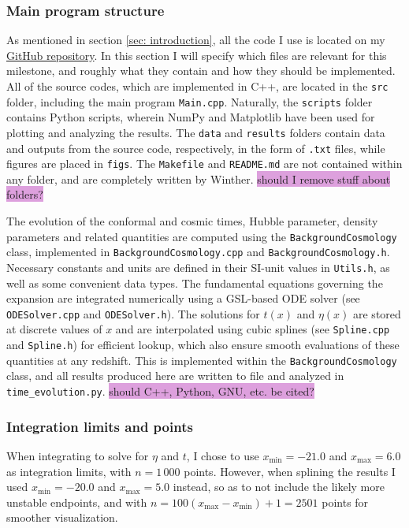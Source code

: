 \documentclass{aa}
\begin{document}
\subsubsection{Main program structure}
As mentioned in section \ref{sec: introduction}, all the code I use is located on my \href{https://github.com/paljettrosa/AST5220}{GitHub repository}. In this section I will specify which files are relevant for this milestone, and roughly what they contain and how they should be implemented. All of the source codes, which are implemented in C++, are located in the \verb|src| folder, including the main program \verb|Main.cpp|. Naturally, the \verb|scripts| folder contains Python scripts, wherein NumPy and Matplotlib have been used for plotting and analyzing the results. The \verb|data| and \verb|results| folders contain data and outputs from the source code, respectively, in the form of \verb|.txt| files, while figures are placed in \verb|figs|. The \verb|Makefile| and \verb|README.md| are not contained within any folder, and are completely written by Winther. \colorbox{Plum}{should I remove stuff about folders?}

The evolution of the conformal and cosmic times, Hubble parameter, density parameters and related quantities are computed using the \verb|BackgroundCosmology| class, implemented in \verb|BackgroundCosmology.cpp| and \verb|BackgroundCosmology.h|. Necessary constants and units are defined in their SI-unit values in \verb|Utils.h|, as well as some convenient data types. The fundamental equations governing the expansion are integrated numerically using a GSL-based ODE solver (see \verb|ODESolver.cpp| and \verb|ODESolver.h|). The solutions for $t(x)$ and $\eta(x)$ are stored at discrete values of $x$ and are interpolated using cubic splines (see \verb|Spline.cpp| and \verb|Spline.h|) for efficient lookup, which also ensure smooth evaluations of these quantities at any redshift. This is implemented within the \verb|BackgroundCosmology| class, and all results produced here are written to file and analyzed in \verb|time_evolution.py|. \colorbox{Plum}{should C++, Python, GNU, etc. be cited?}


\subsubsection{Integration limits and points}
When integrating to solve for $\eta$ and $t$, I chose to use $x_\text{min}=-21.0$ and $x_\text{max}=6.0$ as integration limits, with $n=1\,000$ points. However, when splining the results I used $x_\text{min}=-20.0$ and $x_\text{max}=5.0$ instead, so as to not include the likely more unstable endpoints, and with $n=100(x_\text{max}-x_\text{min})+1=2501$ points for smoother visualization.
\end{document}
